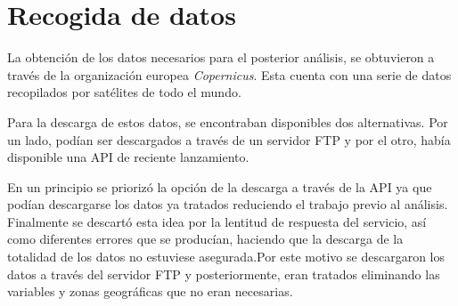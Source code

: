 


\begin{comment}
Este apartado pretende recoger los aspectos más interesantes del desarrollo del proyecto, comentados por los autores del mismo.
Debe incluir desde la exposición del ciclo de vida utilizado, hasta los detalles de mayor relevancia de las fases de análisis, diseño e implementación.
Se busca que no sea una mera operación de copiar y pegar diagramas y extractos del código fuente, sino que realmente se justifiquen los caminos de solución que se han tomado, especialmente aquellos que no sean triviales.
Puede ser el lugar más adecuado para documentar los aspectos más interesantes del diseño y de la implementación, con un mayor hincapié en aspectos tales como el tipo de arquitectura elegido, los índices de las tablas de la base de datos, normalización y desnormalización, distribución en ficheros3, reglas de negocio dentro de las bases de datos (EDVHV GH GDWRV DFWLYDV), aspectos de desarrollo relacionados con el WWW...
Este apartado, debe convertirse en el resumen de la experiencia práctica del proyecto, y por sí mismo justifica que la memoria se convierta en un documento útil, fuente de referencia para los autores, los tutores y futuros alumnos.
\end{comment}


\section{Recogida de datos}
La obtención de los datos necesarios para el posterior análisis, se obtuvieron a través de la organización europea \emph{Copernicus}. Esta cuenta con una serie de datos recopilados por satélites de todo el mundo.

Para la descarga de estos datos, se encontraban disponibles dos alternativas. Por un lado, podían ser descargados a través de un servidor FTP y por el otro, había disponible una API de reciente lanzamiento.

En un principio se priorizó la opción de la descarga a través de la API ya que podían descargarse los datos ya tratados reduciendo el trabajo previo al análisis. Finalmente se descartó esta idea por la lentitud de respuesta del servicio, así como diferentes errores que se producían, haciendo que la descarga de la totalidad de los datos no estuviese asegurada.Por este motivo se descargaron los datos a través del servidor FTP y posteriormente, eran tratados eliminando las variables y zonas geográficas que no eran necesarias.


